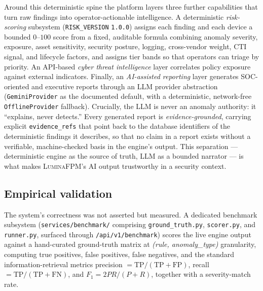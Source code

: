 Around this deterministic spine the platform layers three further capabilities that turn raw findings into operator-actionable intelligence. A deterministic \emph{risk-scoring} subsystem (\texttt{RISK\_VERSION} \texttt{1.0.0}) assigns each finding and each device a bounded $0$--$100$ score from a fixed, auditable formula combining anomaly severity, exposure, asset sensitivity, security posture, logging, cross-vendor weight, CTI signal, and lifecycle factors, and assigns tier bands so that operators can triage by priority. An API-based \emph{cyber threat intelligence} layer correlates policy exposure against external indicators. Finally, an \emph{AI-assisted reporting} layer generates SOC-oriented and executive reports through an LLM provider abstraction (\texttt{GeminiProvider} as the documented default, with a deterministic, network-free \texttt{OfflineProvider} fallback). Crucially, the LLM is never an anomaly authority: it ``explains, never detects.'' Every generated report is \emph{evidence-grounded}, carrying explicit \texttt{evidence\_refs} that point back to the database identifiers of the deterministic findings it describes, so that no claim in a report exists without a verifiable, machine-checked basis in the engine's output. This separation --- deterministic engine as the source of truth, LLM as a bounded narrator --- is what makes \textsc{LuminaFPM}'s AI output trustworthy in a security context.


\subsection{Empirical validation}
\label{sec:ch5-validation}

The system's correctness was not asserted but measured. A dedicated benchmark subsystem (\texttt{services/benchmark/} comprising \texttt{ground\_truth.py}, \texttt{scorer.py}, and \texttt{runner.py}, surfaced through \texttt{/api/v1/benchmark}) scores the live engine output against a hand-curated ground-truth matrix at \emph{(rule, anomaly\_type)} granularity, computing true positives, false positives, false negatives, and the standard information-retrieval metrics precision $=\text{TP}/(\text{TP}+\text{FP})$, recall $=\text{TP}/(\text{TP}+\text{FN})$, and $F_1 = 2PR/(P+R)$, together with a severity-match rate.

